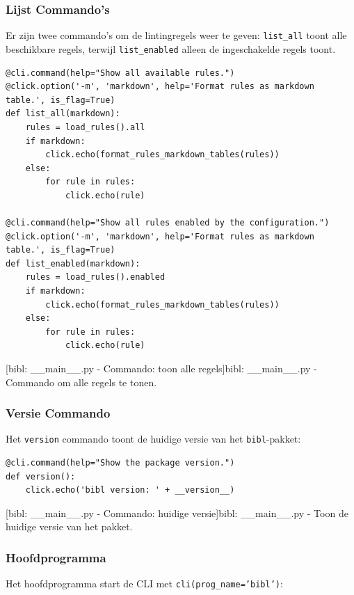 \subsubsection{Lijst Commando's}

Er zijn twee commando's om de lintingregels weer te geven: \texttt{list\_all} toont alle beschikbare regels, terwijl \texttt{list\_enabled} alleen de ingeschakelde regels toont.

\begin{verbatim}
@cli.command(help="Show all available rules.")
@click.option('-m', 'markdown', help='Format rules as markdown table.', is_flag=True)
def list_all(markdown):
    rules = load_rules().all
    if markdown:
        click.echo(format_rules_markdown_tables(rules))
    else:
        for rule in rules:
            click.echo(rule)

@cli.command(help="Show all rules enabled by the configuration.")
@click.option('-m', 'markdown', help='Format rules as markdown table.', is_flag=True)
def list_enabled(markdown):
    rules = load_rules().enabled
    if markdown:
        click.echo(format_rules_markdown_tables(rules))
    else:
        for rule in rules:
            click.echo(rule)
\end{verbatim}
[bibl: \_\_main\_\_.py - Commando: toon alle regels]{bibl: \_\_main\_\_.py - Commando om alle regels te tonen. \label{lst:bibl_main_lint_command}}

\subsubsection{Versie Commando}

Het \texttt{version} commando toont de huidige versie van het \texttt{bibl}-pakket:

\begin{verbatim}
@cli.command(help="Show the package version.")
def version():
    click.echo('bibl version: ' + __version__)
\end{verbatim}
[bibl: \_\_main\_\_.py - Commando: huidige versie]{bibl: \_\_main\_\_.py - Toon de huidige versie van het pakket. \label{lst:bibl_version_command}}
\subsubsection{Hoofdprogramma}

Het hoofdprogramma start de \acrshort{CLI} met \texttt{cli(prog\_name='bibl')}:

